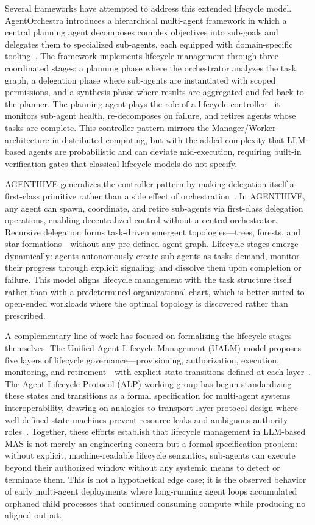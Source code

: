 Several frameworks have attempted to address this extended lifecycle model. AgentOrchestra introduces a hierarchical multi-agent framework in which a central planning agent decomposes complex objectives into sub-goals and delegates them to specialized sub-agents, each equipped with domain-specific tooling~\cite{agentorchestra2025}. The framework implements lifecycle management through three coordinated stages: a planning phase where the orchestrator analyzes the task graph, a delegation phase where sub-agents are instantiated with scoped permissions, and a synthesis phase where results are aggregated and fed back to the planner. The planning agent plays the role of a lifecycle controller---it monitors sub-agent health, re-decomposes on failure, and retires agents whose tasks are complete. This controller pattern mirrors the Manager/Worker architecture in distributed computing, but with the added complexity that LLM-based agents are probabilistic and can deviate mid-execution, requiring built-in verification gates that classical lifecycle models do not specify.

AGENTHIVE generalizes the controller pattern by making delegation itself a first-class primitive rather than a side effect of orchestration~\cite{agenthive2025}. In AGENTHIVE, any agent can spawn, coordinate, and retire sub-agents via first-class delegation operations, enabling decentralized control without a central orchestrator. Recursive delegation forms task-driven emergent topologies---trees, forests, and star formations---without any pre-defined agent graph. Lifecycle stages emerge dynamically: agents autonomously create sub-agents as tasks demand, monitor their progress through explicit signaling, and dissolve them upon completion or failure. This model aligns lifecycle management with the task structure itself rather than with a predetermined organizational chart, which is better suited to open-ended workloads where the optimal topology is discovered rather than prescribed.

A complementary line of work has focused on formalizing the lifecycle stages themselves. The Unified Agent Lifecycle Management (UALM) model proposes five layers of lifecycle governance---provisioning, authorization, execution, monitoring, and retirement---with explicit state transitions defined at each layer~\cite{ualm2026}. The Agent Lifecycle Protocol (ALP) working group has begun standardizing these states and transitions as a formal specification for multi-agent systems interoperability, drawing on analogies to transport-layer protocol design where well-defined state machines prevent resource leaks and ambiguous authority roles~\cite{alp2025}. Together, these efforts establish that lifecycle management in LLM-based MAS is not merely an engineering concern but a formal specification problem: without explicit, machine-readable lifecycle semantics, sub-agents can execute beyond their authorized window without any systemic means to detect or terminate them. This is not a hypothetical edge case; it is the observed behavior of early multi-agent deployments where long-running agent loops accumulated orphaned child processes that continued consuming compute while producing no aligned output.

